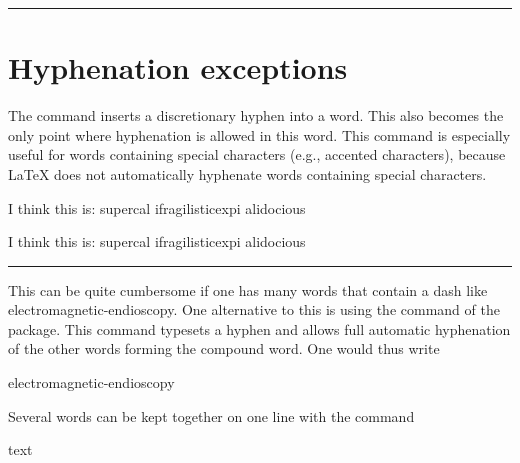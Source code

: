 {{\hfill\hfill\color{orange}\rule{5cm}{1pt}\par}
\hfill\hfill{\hbox{\small}


\section{Hyphenation exceptions}

The command \cs{-}  inserts a discretionary hyphen into a word. This also becomes the only point where hyphenation is allowed in this word. This command is especially useful for words containing special characters (e.g., accented characters), because LaTeX does not automatically hyphenate words containing special characters.

\begin{teX}
\begin{minipage}{2in}
I think this is: su\-per\-cal\-%
i\-frag\-i\-lis\-tic\-ex\-pi\-%
al\-i\-do\-cious
\end{minipage}
\end{teX}
\bigskip



\noindent{\color{orange}\rule{5cm}{1pt}\hfill\hfill\par}
\begin{center}
\par
\begin{minipage}{2in}
I think this is: su\-per\-cal\-%
i\-frag\-i\-lis\-tic\-ex\-pi\-%
al\-i\-do\-cious
\par
\end{minipage}
\end{center}
{\hfill\hfill\color{orange}\rule{5cm}{1pt}\par}
\hfill\hfill{\hbox{\small}
\bigskip

This can be quite cumbersome if one has many words that contain a dash like electromagnetic-endioscopy. One alternative to this is using the  command of the  package. This command typesets a hyphen and allows full automatic hyphenation of the other words forming the compound word. One would thus write

\begin{teX}
electromagnetic\hyp{}endioscopy
\end{teX}


Several words can be kept together on one line with the command

\begin{teX}
\mbox{text}
\end{teX}

}}}

